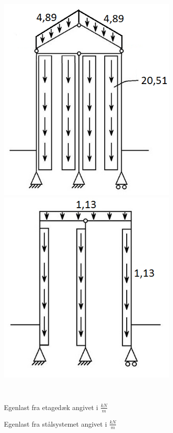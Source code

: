 \begin{figure}[H]\centering
	\begin{minipage}[b]{0.48\textwidth}\centering
		\includegraphics[width=0.80\textwidth]{billeder/egenlastetage.png} %
	\end{minipage}\hfill
	\begin{minipage}[b]{0.48\textwidth}\centering
		\includegraphics[width=0.8\textwidth]{billeder/egenlaststaal.png} %
	\end{minipage}\\ %
	\begin{minipage}[t]{0.48\textwidth}
		\caption{Egenlast fra etagedæk angivet i $\frac{kN}{m}$} %
		\label{fig:m}
	\end{minipage}\hfill
	\begin{minipage}[t]{0.48\textwidth}
		\caption{Egenlast fra stålsystemet angivet i $\frac{kN}{m}$} %
		\label{fig:n}
	\end{minipage}
\end{figure}

